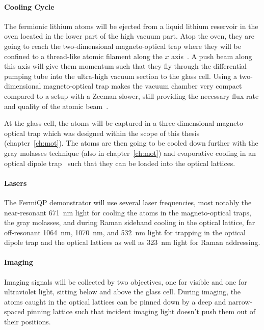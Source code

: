 \paragraph{Cooling Cycle}
The fermionic lithium atoms will be ejected from a liquid lithium reservoir in the oven located in the lower part of the high vacuum part. Atop the oven, they are going to reach the two-dimensional magneto-optical trap where they will be confined to a thread-like atomic filament along the $x$ axis~\cite{qesja_notitle_2022}.  A push beam along this axis will give them momentum such that they fly through the differential pumping tube into the ultra-high vacuum section to the glass cell. Using a two-dimensional magneto-optical trap makes the vacuum chamber very compact compared to a setup with a Zeeman slower, still providing the necessary flux rate and quality of the atomic beam~\cite{tiecke_high-flux_2009}.

At the glass cell, the atoms will be captured in a three-dimensional magneto-optical trap which was designed within the scope of this thesis (chapter~\ref{ch:mot}). The atoms are then going to be cooled down further with the gray molasses technique (also in chapter~\ref{ch:mot}) and evaporative cooling in an optical dipole trap~\cite{sun_construction_2022} such that they can be loaded into the optical lattices.

\paragraph{Lasers}
The FermiQP demonstrator will use several laser frequencies, most notably the near-resonant \SI[]{671}{\nano\meter} light for cooling the atoms in the magneto-optical traps, the gray molasses, and during Raman sideband cooling in the optical lattice, far off-resonant \SI[]{1064}{\nano\meter}, \SI[]{1070}{\nano\meter}, and \SI[]{532}{\nano\meter} light for trapping in the optical dipole trap and the optical lattices as well as \SI[]{323}{\nano\meter} light for Raman addressing.

\paragraph{Imaging}
Imaging signals will be collected by two objectives, one for visible and one for ultraviolet light, sitting below and above the glass cell. During imaging, the atoms caught in the optical lattices can be pinned down by a deep and narrow-spaced pinning lattice such that incident imaging light doesn't push them out of their positions.

